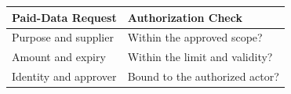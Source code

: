 \begin{tabular}{@{}P{4.0cm}P{8.5cm}@{}}
\toprule
\textbf{Paid-Data Request} & \textbf{Authorization Check} \\
\midrule
Purpose and supplier & Within the approved scope? \\
Amount and expiry & Within the limit and validity? \\
Identity and approver & Bound to the authorized actor? \\
\bottomrule
\end{tabular}
